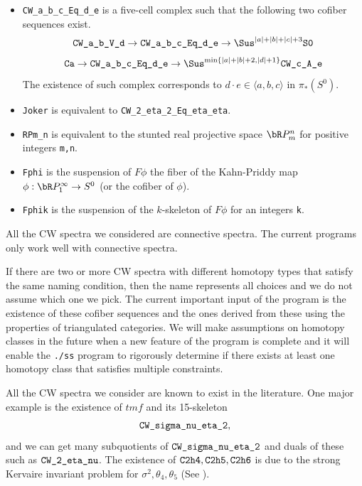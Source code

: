 \documentclass{amsart}
\numberwithin{equation}{section}
\begin{document}
\begin{notation}
\begin{itemize}
        $$\verb|CW_a_b|\to \verb|CW_a_b_V_c|\to \Sus^{|c|+1}\verb|S0|$$
        $$\verb|Cc|\to \verb|CW_a_b_V_c|\to \Sus^{|a|+1}\verb|Cb|$$
        \item \verb|CW_a_b_c_Eq_d_e| is a five-cell complex such that the following two cofiber sequences exist.
        $$\verb|CW_a_b_V_d|\to \verb|CW_a_b_c_Eq_d_e|\to \Sus^{|a|+|b|+|c|+3}\verb|S0|$$
        $$\verb|Ca|\to \verb|CW_a_b_c_Eq_d_e|\to \Sus^{\min\{|a|+|b|+2,|d|+1\}}\verb|CW_c_A_e|$$
        The existence of such complex corresponds to $d\cdot e\in \langle a, b, c\rangle$ in $\pi_*(S^0)$.
        \item \verb|Joker| is equivalent to \verb|CW_2_eta_2_Eq_eta_eta|.
        \item \verb|RPm_n| is equivalent to the stunted real projective space $\bR P_m^n$ for positive integers \verb|m,n|.
        \item \verb|Fphi| is the suspension of $F\phi$ the fiber of the Kahn-Priddy map $\phi: \bR P_1^\infty\to S^0$ (or the cofiber of $\phi$).
        \item \verb|Fphik| is the suspension of the $k$-skeleton of $F\phi$ for an integers \verb|k|.
    \end{itemize}
\end{notation}
\begin{remark}
    All the CW spectra we considered are connective spectra. The current programs only work well with connective spectra.
\end{remark}
\begin{remark}
    If there are two or more CW spectra with different homotopy types that satisfy the same naming condition, then the name represents all choices and we do not assume which one we pick. The current important input of the program is the existence of these cofiber sequences and the ones derived from these using the properties of triangulated categories. We will make assumptions on homotopy classes in the future when a new feature of the program is complete and it will enable the \verb|./ss| program to rigorously determine if there exists at least one homotopy class that satisfies multiple constraints.
\end{remark}

All the CW spectra we consider are known to exist in the literature. One major example is the existence of $tmf$ and its 15-skeleton 
$$\verb|CW_sigma_nu_eta_2|,$$
and we can get many subquotients of $\verb|CW_sigma_nu_eta_2|$ and duals of these such as $\verb|CW_2_eta_nu|$. The existence of $\verb|C2h4|, \verb|C2h5|, \verb|C2h6|$ is due to the strong Kervaire invariant problem for $\sigma^2,\theta_4,\theta_5$ (See \cite{BarrattJonesMahowald} \cite{Xu}).
\end{document}
